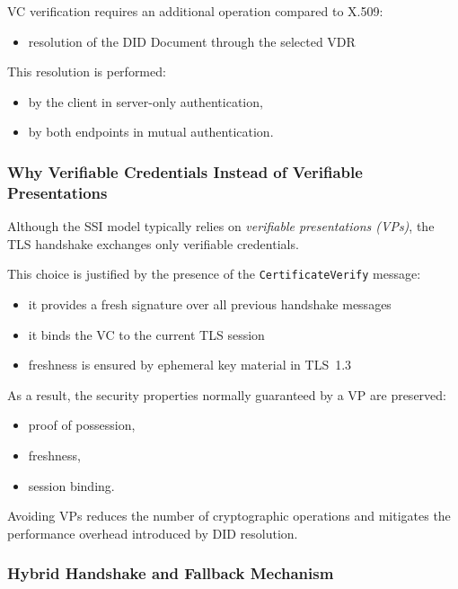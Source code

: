 \noindent
VC verification requires an additional operation compared to X.509:
\begin{itemize}
    \item resolution of the DID Document through the selected VDR
\end{itemize}

\noindent
This resolution is performed:
\begin{itemize}
    \item by the client in server-only authentication,
    \item by both endpoints in mutual authentication.
\end{itemize}

\subsubsection*{Why Verifiable Credentials Instead of Verifiable Presentations}

\noindent
Although the SSI model typically relies on \emph{verifiable presentations (VPs)}, the TLS handshake exchanges only verifiable credentials.

\noindent
This choice is justified by the presence of the \texttt{CertificateVerify} message:
\begin{itemize}
    \item it provides a fresh signature over all previous handshake messages
    \item it binds the VC to the current TLS session
    \item freshness is ensured by ephemeral key material in TLS~1.3
\end{itemize}

\noindent
As a result, the security properties normally guaranteed by a VP are preserved:
\begin{itemize}
    \item proof of possession,
    \item freshness,
    \item session binding.
\end{itemize}

\noindent
Avoiding VPs reduces the number of cryptographic operations and mitigates the performance overhead introduced by DID resolution.

\subsubsection*{Hybrid Handshake and Fallback Mechanism}

